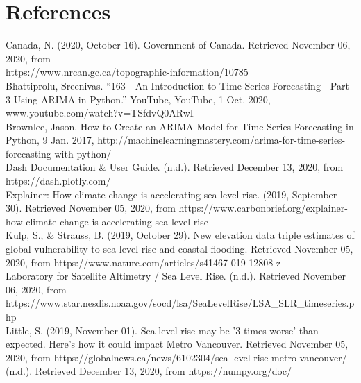\documentclass[fontsize=11pt]{article}
\begin{document}
    \section*{References}
    \begin{hangparas}{.25in}{1}
        Canada, N. (2020, October 16). Government of Canada. Retrieved November 06, 2020, from \\ https://www.nrcan.gc.ca/topographic-information/10785 \\

        Bhattiprolu, Sreenivas. “163 - An Introduction to Time Series Forecasting - Part 3 Using ARIMA in Python.” YouTube,
        YouTube, 1 Oct. 2020, www.youtube.com/watch?v=TSfdvQ0ARwI \\

        Brownlee, Jason. How to Create an ARIMA Model for Time Series Forecasting in Python, 9 Jan. 2017,
        http://machinelearningmastery.com/arima-for-time-series-forecasting-with-python/ \\

        Dash Documentation & User Guide. (n.d.). Retrieved December 13, 2020, from https://dash.plotly.com/ \\

        Explainer: How climate change is accelerating sea level rise. (2019, September 30). Retrieved November 05, 2020, from https://www.carbonbrief.org/explainer-how-climate-change-is-accelerating-sea-level-rise \\

        Kulp, S., & Strauss, B. (2019, October 29). New elevation data triple estimates of global vulnerability to sea-level rise and coastal flooding. Retrieved November 05, 2020, from https://www.nature.com/articles/s41467-019-12808-z \\

        Laboratory for Satellite Altimetry / Sea Level Rise. (n.d.).
        Retrieved November 06, 2020, from \\ https://www.star.nesdis.noaa.gov/socd/lsa/SeaLevelRise/LSA_SLR_timeseries.php \\

        Little, S. (2019, November 01). Sea level rise may be '3 times worse' than expected. Here's how it could impact Metro Vancouver. Retrieved November 05, 2020, from https://globalnews.ca/news/6102304/sea-level-rise-metro-vancouver/\\

        (n.d.). Retrieved December 13, 2020, from https://numpy.org/doc/ \\


\end{hangparas}
\end{document}
